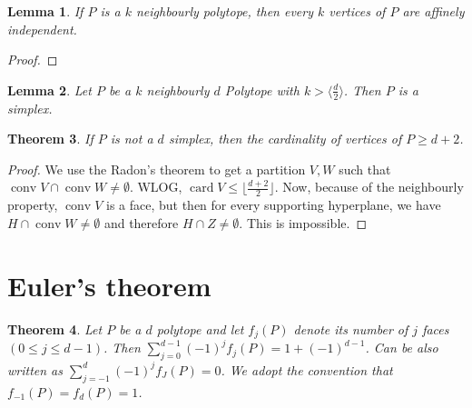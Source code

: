 \documentclass[a4paper,10pt,landscape]{article}
\newtheorem{theorem}{Theorem}[section]
\newtheorem{lemma}[theorem]{Lemma}
\def\conv{\operatorname{conv}}
\def\card{\operatorname{card}}
\begin{document}
\begin{multicols}{3}
    \begin{lemma}
      If $P$ is a $k$ neighbourly polytope, then every $k$ vertices of $P$ are
      affinely independent.
    \end{lemma}
    \begin{proof}
      
    \end{proof}

    \begin{lemma}
      Let $P$ be a $k$ neighbourly $d$ Polytope with $k > \langle \frac{d}{2}
      \rangle$. Then $P$ is a simplex.
    \end{lemma}
    \begin{theorem}
      If $P$ is not a $d$ simplex, then the cardinality of vertices of $P \ge d
      + 2$.
    \end{theorem}
    \begin{proof}
      We use the Radon's theorem to get a partition $V, W$ such that
      $\conv V \cap \conv W \neq \emptyset$. WLOG, $\card V \le \lfloor
      \frac{d+2}{2} \rfloor$. Now, because of the neighbourly property, $\conv
      V$ is a face, but then for every supporting hyperplane, we have $H \cap
      \conv W \neq \emptyset$ and therefore $H \cap Z \neq \emptyset$. This is
      impossible.
    \end{proof}


    \section{Euler's theorem}
    \begin{theorem}
      Let $P$ be a $d$ polytope and let $f_j(P)$ denote its number of $j$ faces
      $(0 \le j \le d - 1)$. Then $\sum_{j = 0}^{d - 1} (-1)^j f_j(P) = 1 +
      (-1)^{d-1}$. Can be also written as $\sum_{j=-1}^{d} (-1)^{j} f_J(P) = 0$.
      We adopt the convention that $f_{-1}(P) = f_d(P) = 1$.
    \end{theorem}


\end{multicols}
\end{document}
